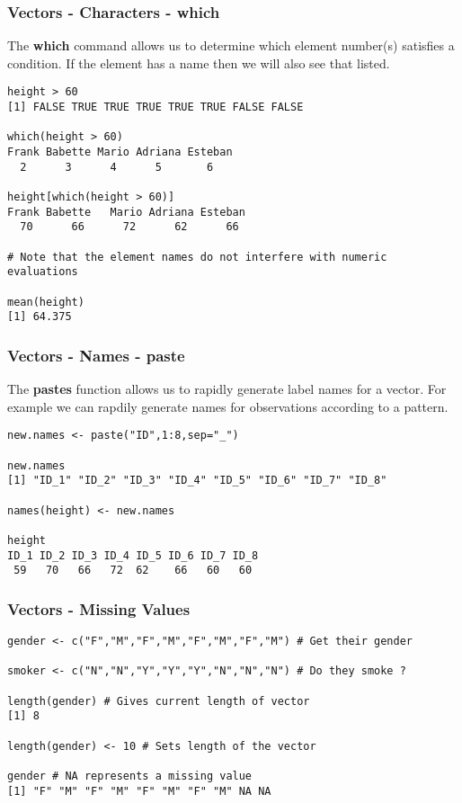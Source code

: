 \documentclass{beamer}
\begin{document}
%

\begin{frame}[fragile]
\frametitle{Vectors - Characters - which}
The \textbf{which} command allows us to determine which element number(s) satisfies a condition. If the element has a name then we will also see that listed.
\footnotesize
\begin{verbatim}
height > 60
[1] FALSE TRUE TRUE TRUE TRUE TRUE FALSE FALSE

which(height > 60)
Frank Babette Mario Adriana Esteban
  2      3      4      5       6

height[which(height > 60)]
Frank Babette   Mario Adriana Esteban 
  70      66      72      62      66 

# Note that the element names do not interfere with numeric evaluations

mean(height)
[1] 64.375
\end{verbatim}
\end{frame}

%

\begin{frame}[fragile]
\frametitle{Vectors - Names - paste}
The \textbf{pastes} function allows us to rapidly generate label names for a vector. For example we can rapdily generate names for observations according to a pattern.
\small
\begin{verbatim}
new.names <- paste("ID",1:8,sep="_")

new.names
[1] "ID_1" "ID_2" "ID_3" "ID_4" "ID_5" "ID_6" "ID_7" "ID_8"

names(height) <- new.names

height
ID_1 ID_2 ID_3 ID_4 ID_5 ID_6 ID_7 ID_8
 59   70   66   72  62    66   60   60
\end{verbatim}
\end{frame}


\begin{frame}[fragile]
\frametitle{Vectors - Missing Values}
\small
\begin{verbatim}
gender <- c("F","M","F","M","F","M","F","M") # Get their gender

smoker <- c("N","N","Y","Y","Y","N","N","N") # Do they smoke ?

length(gender) # Gives current length of vector
[1] 8

length(gender) <- 10 # Sets length of the vector

gender # NA represents a missing value
[1] "F" "M" "F" "M" "F" "M" "F" "M" NA NA
\end{verbatim}
\end{frame}
\end{document}
